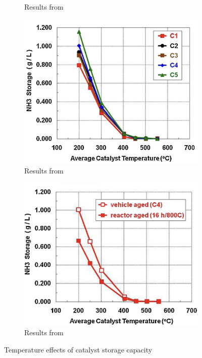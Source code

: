 \begin{figure}[H]
\begin{minipage}{0.4\textwidth}
\begin{figure}[H]
            \caption*{Results from \cite{schmieg2012thermal}}
        \end{figure}
    \end{minipage}
    \begin{minipage}{0.4\textwidth}
        \begin{figure}[H]
            \includegraphics[width = \textwidth]{./figs/storage_capacity/th_2.png}
            \caption*{Results from \cite{schmieg2012thermal}}
        \end{figure}
    \end{minipage}
    \begin{minipage}{0.4\textwidth}
        \begin{figure}[H]
            \centering
            \includegraphics[width = \textwidth]{./figs/storage_capacity/th_3.png}
            \caption*{Results from \cite{schmieg2012thermal}}
        \end{figure}
    \end{minipage}
    \caption{Temperature effects of catalyst storage capacity}
\end{figure}



